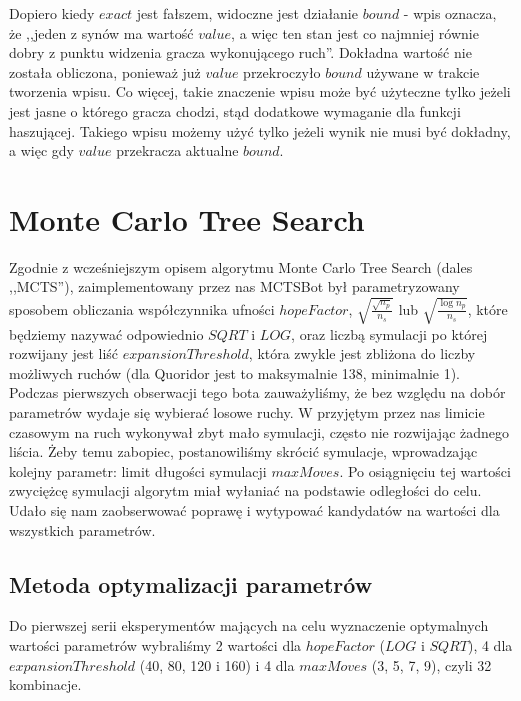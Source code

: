 \documentclass{pracamgr}
\begin{document}
Dopiero kiedy \(exact\) jest fałszem, widoczne jest działanie \(bound\) - wpis oznacza, że ,,jeden z synów ma wartość \(value\), a więc ten stan jest co najmniej równie dobry z punktu widzenia gracza wykonującego ruch''. Dokładna wartość nie została obliczona, ponieważ już \(value\) przekroczyło \(bound\) używane w trakcie tworzenia wpisu.
Co więcej, takie znaczenie wpisu może być użyteczne tylko jeżeli jest jasne o którego gracza chodzi, stąd dodatkowe wymaganie dla funkcji haszującej.
Takiego wpisu możemy użyć tylko jeżeli wynik nie musi być dokładny, a więc gdy \(value\) przekracza aktualne \(bound\).

\section{Monte Carlo Tree Search}

Zgodnie z wcześniejszym opisem algorytmu Monte Carlo Tree Search (dales ,,MCTS''), zaimplementowany przez nas MCTSBot był parametryzowany sposobem obliczania współczynnika ufności \(hopeFactor\), \(\sqrt{\frac{\sqrt{n_p}}{n_s}}\) lub \(\sqrt{\frac{\log{n_p}}{n_s}}\), które będziemy nazywać odpowiednio \(SQRT\) i \(LOG\), oraz liczbą symulacji po której rozwijany jest liść \(expansionThreshold\), która zwykle jest zbliżona do liczby możliwych ruchów (dla Quoridor jest to maksymalnie 138, minimalnie 1).
Podczas pierwszych obserwacji tego bota zauważyliśmy, że bez względu na dobór parametrów wydaje się wybierać losowe ruchy.
W przyjętym przez nas limicie czasowym na ruch wykonywał zbyt mało symulacji, często nie rozwijając żadnego liścia.
Żeby temu zabopiec, postanowiliśmy skrócić symulacje, wprowadzając kolejny parametr: limit długości symulacji \(maxMoves\).
Po osiągnięciu tej wartości zwyciężcę symulacji algorytm miał wyłaniać na podstawie odległości do celu.
Udało się nam zaobserwować poprawę i wytypować kandydatów na wartości dla wszystkich parametrów.

\subsection{Metoda optymalizacji parametrów}

Do pierwszej serii eksperymentów mających na celu wyznaczenie optymalnych wartości parametrów wybraliśmy 2 wartości dla \(hopeFactor\) (\(LOG\) i \(SQRT\)), 4 dla \(expansionThreshold\) (40, 80, 120 i 160) i 4 dla \(maxMoves\) (3, 5, 7, 9), czyli 32 kombinacje.
\end{document}
